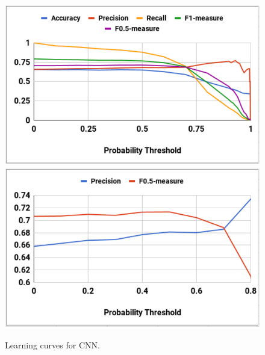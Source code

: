 \begin{figure}[H]
\centering
\includegraphics[scale=0.58]{figures/result_cnn1.pdf}
\includegraphics[scale=0.58]{figures/result_cnn2.pdf}
\caption{Learning curves for CNN.}
\label{fig:learning curve of cnn}
\end{figure}
